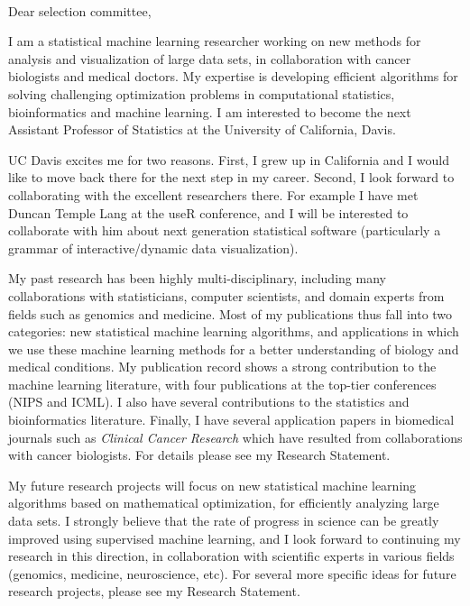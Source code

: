 \documentclass{article}
\begin{document}
\mbox{ }

Dear selection committee,

I am a 
statistical 
machine learning researcher working on new methods for
analysis and visualization of large data sets, in
collaboration with 
cancer
biologists and medical doctors. 
My expertise is developing efficient algorithms for solving
challenging optimization problems in computational statistics, bioinformatics and
machine learning. I am interested to become the next Assistant
Professor of Statistics at the University of California, Davis.

UC Davis excites me for two reasons. First, I grew up in California
and I would like to move back there for the next step in my
career. Second, I look forward to collaborating with the excellent
researchers there. For example I have met Duncan Temple Lang at the
useR conference, and I will be interested to collaborate with him
about next generation statistical software (particularly a grammar of interactive/dynamic data visualization).

My past research has been highly multi-disciplinary, including many
collaborations with 
statisticians,
 computer scientists,
and domain experts from fields such as genomics and medicine. 
Most of my
publications thus fall into two categories: new statistical machine
learning algorithms, and applications in which we use these machine
learning methods for a better understanding of 
biology and medical conditions. 
My publication record shows a strong
contribution to the machine learning literature, with four
publications at the top-tier conferences (NIPS and ICML). I also have
several contributions to the statistics 
and bioinformatics 
literature.
Finally, I have several application papers in biomedical journals such
as {\it Clinical Cancer Research} which have resulted from
collaborations with cancer biologists. For details please see my
Research Statement. 

My future research projects will focus on new statistical machine
learning algorithms based on mathematical optimization, for
efficiently analyzing large data sets. I strongly believe that the
rate of progress in science can be greatly improved using supervised
machine learning, and I look forward to continuing my research in this
direction, in collaboration with scientific experts in various fields
(genomics, medicine, neuroscience, etc). For several more specific
ideas for future research projects, please see my Research Statement.
\end{document}
